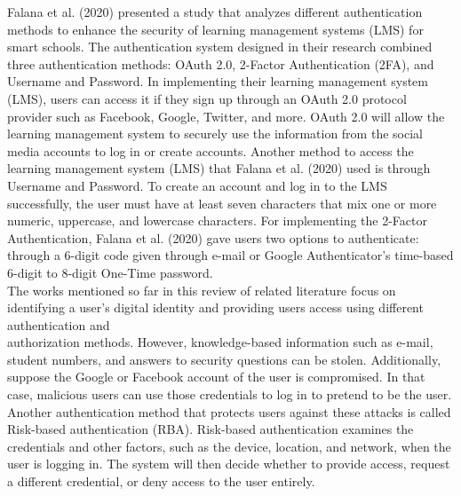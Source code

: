\documentclass{icsthesis}
\begin{document}
\begin{mainmatter}
\indent Falana et al. (2020) presented a study that analyzes different authentication methods to enhance the security of learning management systems (LMS) for smart schools. The authentication system designed in their research combined three authentication methods: OAuth 2.0, 2-Factor Authentication (2FA), and Username and Password. In implementing their learning management system (LMS), users can access it if they sign up through an OAuth 2.0 protocol provider such as Facebook, Google, Twitter, and more. OAuth 2.0 will allow the learning management system to securely use the information from the social media accounts to log in or create accounts. Another method to access the learning management system (LMS) that Falana et al. (2020) used is through Username and Password. To create an account and log in to the LMS successfully, the user must have at least seven characters that mix one or more numeric, uppercase, and lowercase characters. For implementing the 2-Factor Authentication, Falana et al. (2020) gave users two options to authenticate: through a 6-digit code given through e-mail or Google Authenticator's time-based 6-digit to 8-digit One-Time password. \\

\indent The works mentioned so far in this review of related literature focus on identifying a user's digital identity and providing users access using different authentication and \\ authorization methods. However, knowledge-based information such as e-mail, student numbers, and answers to security questions can be stolen. Additionally, suppose the Google or Facebook account of the user is compromised. In that case, malicious users can use those credentials to log in to pretend to be the user. Another authentication method that protects users against these attacks is called Risk-based authentication (RBA). Risk-based authentication examines the credentials and other factors, such as the device, location, and network, when the user is logging in. The system will then decide whether to provide access, request a different credential, or deny access to the user entirely.\\


\end{mainmatter}
\end{document}
